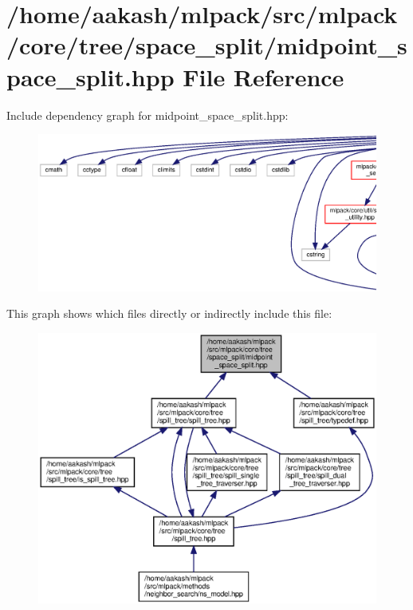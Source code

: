 \section{/home/aakash/mlpack/src/mlpack/core/tree/space\+\_\+split/midpoint\+\_\+space\+\_\+split.hpp File Reference}
\label{midpoint__space__split_8hpp}
Include dependency graph for midpoint\+\_\+space\+\_\+split.\+hpp\+:
\nopagebreak
\begin{figure}[H]
\begin{center}
\leavevmode
\includegraphics[width=350pt]{midpoint__space__split_8hpp__incl}
\end{center}
\end{figure}
This graph shows which files directly or indirectly include this file\+:
\nopagebreak
\begin{figure}[H]
\begin{center}
\leavevmode
\includegraphics[width=350pt]{midpoint__space__split_8hpp__dep__incl}
\end{center}
\end{figure}
